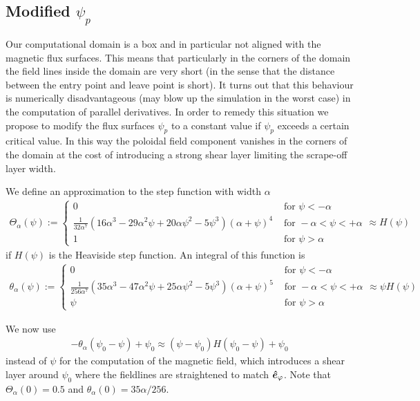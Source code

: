 \subsection{ Modified $\psi_p$}
Our computational domain is a box and in particular not aligned with the
magnetic flux surfaces. This means that particularly in the corners of
the domain the field lines inside the domain are very short (in the
sense that the distance between the entry point and leave point is short).
It turns out that this behaviour is numerically disadvantageous (may
blow up the simulation in the worst case) in the
computation of parallel derivatives. In order to remedy this situation
we propose to modify the flux surfaces $\psi_p$ to a constant value
if $\psi_p$ exceeds a certain critical value. In this way the poloidal
field component vanishes in the corners of the domain at the cost
of introducing a strong shear layer limiting the scrape-off layer width.

We define an approximation to the step function with width $\alpha$
\begin{align}
\Theta_\alpha(\psi) := \begin{cases}
    0 & \text{ for } \psi < - \alpha  \\
    \frac{1}{32 \alpha^7}  \left(16 \alpha^3-29 \alpha^2 \psi+20 \alpha \psi^2-5 \psi^3\right) (\alpha+\psi)^4
    &\text{ for } -\alpha<\psi<+\alpha \\
    1 & \text{ for } \psi > \alpha 
\end{cases}
    \approx H(\psi)
\label{eq:approx_heaviside}
\end{align}
if $H(\psi)$ is the Heaviside step function.
An integral of this function is
\begin{align}
\theta_\alpha(\psi) := \begin{cases}
    0 &\text{ for } \psi < -\alpha \\
    \frac{1}{256 \alpha^7} \left(35 \alpha^3-47 \alpha^2 \psi+25 \alpha \psi^2-5 \psi^3\right) (\alpha+\psi)^5
     &\text{ for } -\alpha<\psi<+\alpha \\
\psi &\text{ for } \psi > \alpha
\end{cases}
    \approx \psi H(\psi)
\end{align}

We now use 
\begin{align}
-\theta_\alpha(\psi_0 - \psi)+\psi_0 \approx (\psi- \psi_0)H(\psi_0-\psi) + \psi_0
\label{eq:modified_psip}
\end{align}
instead of $\psi$ for the computation of the
magnetic field, which introduces a shear layer around $\psi_0$ where the
fieldlines are straightened to match $\bm{\hat{e}}_\varphi$.
Note that $\Theta_\alpha(0) = 0.5$ and $\theta_\alpha(0) = 35\alpha/256$.
